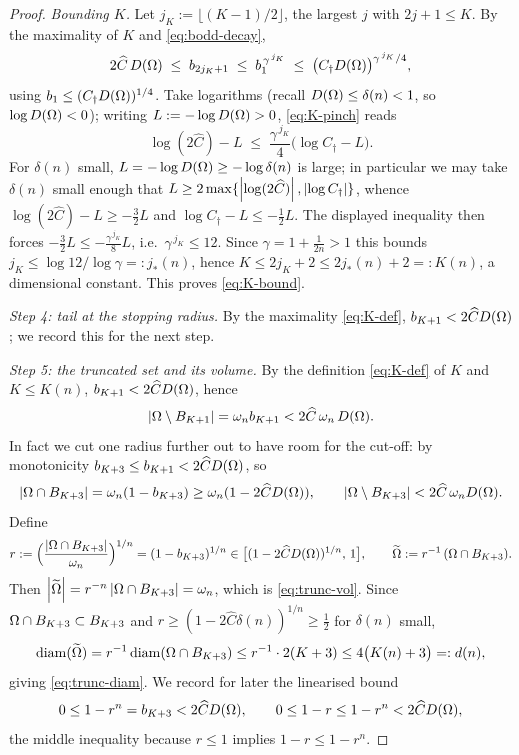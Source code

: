 \begin{proof}
\emph{Bounding $K$.} Let $j_K:=\lfloor(K-1)/2\rfloor$, the largest $j$
with $2j+1\le K$. By the maximality of $K$ and \eqref{eq:bodd-decay},
\begin{equation}\label{eq:K-pinch}
   2\widehat C\,D(\Omega)\;\le\;b_{2j_K+1}\;\le\;b_1^{\,\gamma^{\,j_K}}
   \;\le\;\bigl(C_\dagger D(\Omega)\bigr)^{\gamma^{\,j_K}/4},
\end{equation}
using $b_1\le(C_\dagger D(\Omega))^{1/4}$. Take logarithms (recall
$D(\Omega)\le\delta(n)<1$, so $\log D(\Omega)<0$); writing $L:=-\log D(\Omega)>0$,
\eqref{eq:K-pinch} reads
\[
   \log(2\widehat C)-L
   \;\le\;\frac{\gamma^{\,j_K}}{4}\bigl(\log C_\dagger-L\bigr).
\]
For $\delta(n)$ small, $L=-\log D(\Omega)\ge-\log\delta(n)$ is large; in
particular we may take $\delta(n)$ small enough that
$L\ge2\max\{\left|\log(2\widehat C)\right|,\left|\log C_\dagger\right|\}$, whence
$\log(2\widehat C)-L\ge-\tfrac32 L$ and $\log C_\dagger-L\le-\tfrac12 L$.
The displayed inequality then forces
$-\tfrac32 L\le-\tfrac{\gamma^{\,j_K}}{8}L$, i.e.\
$\gamma^{\,j_K}\le12$. Since $\gamma=1+\tfrac1{2n}>1$ this bounds
$j_K\le\log12/\log\gamma=:j_*(n)$, hence
$K\le2j_K+2\le2j_*(n)+2=:K(n)$, a dimensional constant. This proves
\eqref{eq:K-bound}.

\emph{Step 4: tail at the stopping radius.} By the maximality
\eqref{eq:K-def}, $b_{K+1}<2\widehat C D(\Omega)$; we record this for the next
step.

\smallskip
\emph{Step 5: the truncated set and its volume.}
By the definition \eqref{eq:K-def} of $K$ and $K\le K(n)$,
$b_{K+1}<2\widehat C D(\Omega)$, hence
\begin{equation}\label{eq:tail-controlled}
   \left|\Omega\setminus B_{K+1}\right|=\omega_n b_{K+1}<2\widehat C\,\omega_n\,D(\Omega).
\end{equation}
In fact we cut one radius further out to have room for the cut-off: by
monotonicity $b_{K+3}\le b_{K+1}<2\widehat C D(\Omega)$, so
\begin{equation}\label{eq:vol-cut}
   \left|\Omega\cap B_{K+3}\right|=\omega_n(1-b_{K+3})\ge\omega_n(1-2\widehat C D(\Omega)),
   \qquad
   \left|\Omega\setminus B_{K+3}\right|<2\widehat C\,\omega_n D(\Omega).
\end{equation}
Define
\[
   r:=\Bigl(\frac{\left|\Omega\cap B_{K+3}\right|}{\omega_n}\Bigr)^{1/n}
   =(1-b_{K+3})^{1/n}\in\bigl[(1-2\widehat C D(\Omega))^{1/n},\,1\bigr],
   \qquad
   \widetilde{\Omega}:=r^{-1}\,(\Omega\cap B_{K+3}).
\]
Then $\left|\widetilde{\Omega}\right|=r^{-n}\left|\Omega\cap B_{K+3}\right|=\omega_n$, which is
\eqref{eq:trunc-vol}. Since $\Omega\cap B_{K+3}\subset B_{K+3}$ and
$r\ge(1-2\widehat C\delta(n))^{1/n}\ge\tfrac12$ for $\delta(n)$ small,
\[
   \operatorname{diam}(\widetilde{\Omega})=r^{-1}\operatorname{diam}(\Omega\cap B_{K+3})\le r^{-1}\cdot2(K+3)
   \le4\bigl(K(n)+3\bigr)=:d(n),
\]
giving \eqref{eq:trunc-diam}. We record for later the linearised bound
\begin{equation}\label{eq:r-near-1}
   0\le1-r^n=b_{K+3}<2\widehat C D(\Omega),
   \qquad
   0\le1-r\le1-r^n<2\widehat C D(\Omega),
\end{equation}
the middle inequality because $r\le1$ implies $1-r\le1-r^n$.


\end{proof}

